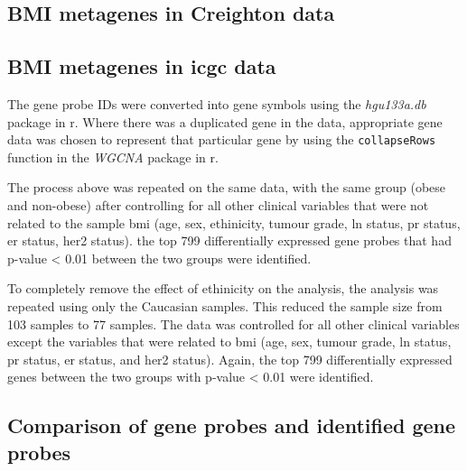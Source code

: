 \subsection{BMI metagenes in Creighton data}
\label{subsec:bmidegmetacr}




\subsection{BMI metagenes in \gls{icgc} data}
\label{subsec:bmidegmetaicgc}

The gene probe IDs were converted into gene symbols using the \textit{hgu133a.db} package in \gls{r}.
Where there was a duplicated gene in the data, appropriate gene data was chosen to represent that particular gene by using the \texttt{collapseRows} function in the \textit{WGCNA} package in \gls{r}.

























\newpage



The process above was repeated on the same data, with the same group (obese and non-obese) after controlling for all other clinical variables that were not related to the sample \gls{bmi} (age, sex, ethinicity, tumour grade, \gls{ln} status, \gls{pr} status, \gls{er} status, \gls{her2} status).
the top 799 differentially expressed gene probes that had p-value \textless{} 0.01 between the two groups were identified.

To completely remove the effect of ethinicity on the analysis, the analysis was repeated using only the Caucasian samples.
This reduced the sample size from 103 samples to 77 samples.
The data was controlled for all other clinical variables except the variables that were related to \gls{bmi} (age, sex, tumour grade, \gls{ln} status, \gls{pr} status, \gls{er} status, and \gls{her2} status).
Again, the top 799 differentially expressed genes between the two groups with p-value \textless{} 0.01 were identified.

\subsection{Comparison of \citet{Creighton2012} gene probes and identified gene probes}
\label{subsec:cfgeneprobes}

